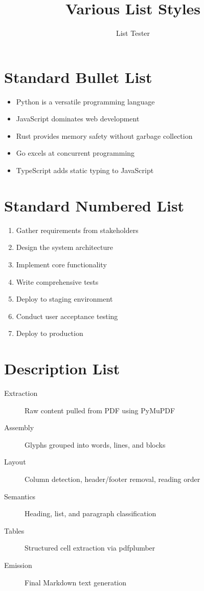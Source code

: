 \documentclass[12pt]{article}
\title{Various List Styles}
\author{List Tester}
\begin{document}
\maketitle

\section{Standard Bullet List}
\begin{itemize}
    \item Python is a versatile programming language
    \item JavaScript dominates web development
    \item Rust provides memory safety without garbage collection
    \item Go excels at concurrent programming
    \item TypeScript adds static typing to JavaScript
\end{itemize}

\section{Standard Numbered List}
\begin{enumerate}
    \item Gather requirements from stakeholders
    \item Design the system architecture
    \item Implement core functionality
    \item Write comprehensive tests
    \item Deploy to staging environment
    \item Conduct user acceptance testing
    \item Deploy to production
\end{enumerate}

\section{Description List}
\begin{description}
    \item[Extraction] Raw content pulled from PDF using PyMuPDF
    \item[Assembly] Glyphs grouped into words, lines, and blocks
    \item[Layout] Column detection, header/footer removal, reading order
    \item[Semantics] Heading, list, and paragraph classification
    \item[Tables] Structured cell extraction via pdfplumber
    \item[Emission] Final Markdown text generation
\end{description}
\end{document}
